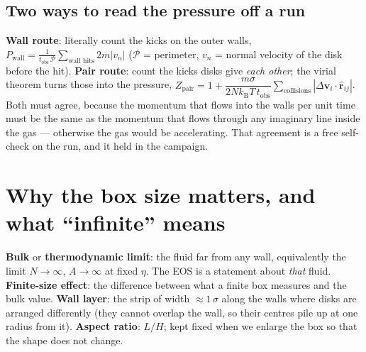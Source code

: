 \documentclass[11pt,a4paper]{article}
\newcommand{\kT}{k_{\mathrm B}T}
\begin{document}
\subsection{Two ways to read the pressure off a run}
\begin{eli}
\textbf{Wall route}: literally count the kicks on the outer walls, $P_{\mathrm{wall}} = \frac{1}{t_{\mathrm{obs}}\,\mathcal P}\sum_{\text{wall hits}}2m|v_n|$ ($\mathcal P$ = perimeter, $v_n$ = normal velocity of the disk before the hit). \textbf{Pair route}: count the kicks disks give \emph{each other}; the virial theorem turns those into the pressure, $Z_{\mathrm{pair}} = 1 + \dfrac{m\sigma}{2N\kT\,t_{\mathrm{obs}}}\sum_{\text{collisions}}|\Delta\mathbf v_i\cdot\hat{\mathbf r}_{ij}|$. Both must agree, because the momentum that flows into the walls per unit time must be the same as the momentum that flows through any imaginary line inside the gas --- otherwise the gas would be accelerating. That agreement is a free self-check on the run, and it held in the campaign.
\end{eli}

\section{Why the box size matters, and what ``infinite'' means}
\label{sec:box}

\begin{term}
\textbf{Bulk} or \textbf{thermodynamic limit}: the fluid far from any wall, equivalently the limit $N\to\infty$, $A\to\infty$ at fixed $\eta$. The EOS is a statement about \emph{that} fluid. \textbf{Finite-size effect}: the difference between what a finite box measures and the bulk value. \textbf{Wall layer}: the strip of width $\approx1\,\sigma$ along the walls where disks are arranged differently (they cannot overlap the wall, so their centres pile up at one radius from it). \textbf{Aspect ratio}: $L/H$; kept fixed when we enlarge the box so that the shape does not change.
\end{term}
\end{document}
